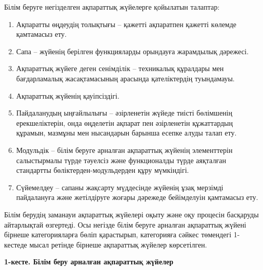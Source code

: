 Білім беруге негізделген ақпараттық жүйелерге қойылатын талаптар:

\begin{enumerate}
\def\labelenumi{\arabic{enumi}.}
\item
  Ақпаратты өңдеудің толықтығы -- қажетті ақпаратпен қажетті көлемде
  қамтамасыз ету.
\item
  Сапа -- жүйенің берілген функцияларды орындауға жарамдылық дәрежесі.
\item
  Ақпараттық жүйеге деген сенімділік -- техникалық құралдары мен
  бағдарламалық жасақтамасының арасында қателіктердің туындамауы.
\item
  Ақпараттық жүйенің қауіпсіздігі.
\item
  Пайдаланудың ыңғайлылығы -- әзірленетін жүйеде тиісті бөлімшенің
  ерекшеліктерін, онда өңделетін ақпарат пен әзірленетін құжаттардың
  құрамын, мазмұны мен нысандарын барынша есепке алуды талап ету.
\item
  Модульдік -- білім беруге арналған ақпараттық жүйенің элементтерін
  салыстырмалы түрде тәуелсіз және функционалды түрде аяқталған
  стандартты бөліктерден-модульдерден құру мүмкіндігі.
\item
  Сүйемелдеу -- сапаны жақсарту мүддесінде жүйенің ұзақ мерзімді
  пайдалануға және жетілдіруге жоғары дәрежеде бейімделуін қамтамасыз
  ету.
\end{enumerate}

Білім берудің заманауи ақпараттық жүйелері оқыту және оқу процесін
басқаруды айтарлықтай өзгертеді. Осы негізде білім беруге арналған
ақпараттық жүйені бірнеше категорияларға бөліп қарастырып, категорияға
сәйкес төмендегі 1-кестеде мысал ретінде бірнеше ақпараттық жүйелер
көрсетілген.

{\bfseries 1-кесте. Білім беру арналған ақпараттық жүйелер}

